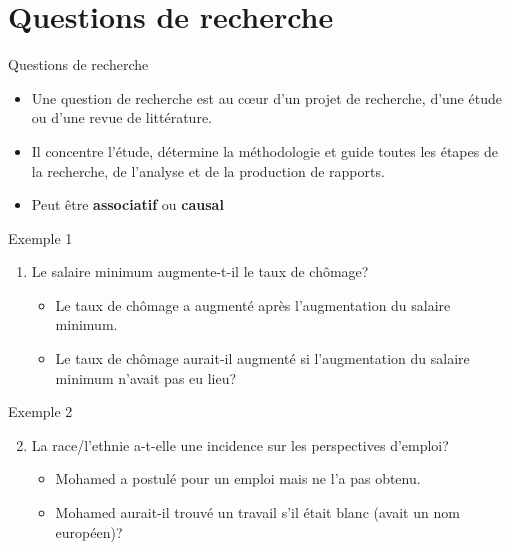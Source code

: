 \documentclass[ignorenonframetext,]{beamer}
\providecommand{\tightlist}{%
  \setlength{\itemsep}{0pt}\setlength{\parskip}{0pt}}
\begin{document}
\hypertarget{questions-de-recherche}{%
\section{Questions de recherche}\label{questions-de-recherche}}

\begin{frame}{Questions de recherche}
\protect\hypertarget{questions-de-recherche-1}{}

\begin{itemize}
\tightlist
\item
  Une question de recherche est au cœur d'un projet de recherche, d'une
  étude ou d'une revue de littérature.
\item
  Il concentre l'étude, détermine la méthodologie et guide toutes les
  étapes de la recherche, de l'analyse et de la production de rapports.
\item
  Peut être \textbf{associatif} ou \textbf{causal}
\end{itemize}

\end{frame}

\begin{frame}{Exemple 1}
\protect\hypertarget{exemple-1}{}

\begin{enumerate}
\tightlist
\item
  Le salaire minimum augmente-t-il le taux de chômage?

  \begin{itemize}
  \tightlist
  \item
    Le taux de chômage a augmenté après l'augmentation du salaire
    minimum.
  \item
    Le taux de chômage aurait-il augmenté si l'augmentation du salaire
    minimum n'avait pas eu lieu?
  \end{itemize}
\end{enumerate}

\end{frame}

\begin{frame}{Exemple 2}
\protect\hypertarget{exemple-2}{}

\begin{enumerate}
\setcounter{enumi}{1}
\tightlist
\item
  La race/l'ethnie a-t-elle une incidence sur les perspectives d'emploi?

  \begin{itemize}
  \tightlist
  \item
    Mohamed a postulé pour un emploi mais ne l'a pas obtenu.
  \item
    Mohamed aurait-il trouvé un travail s'il était blanc (avait un nom
    européen)?
  \end{itemize}
\end{enumerate}

\end{frame}
\end{document}
